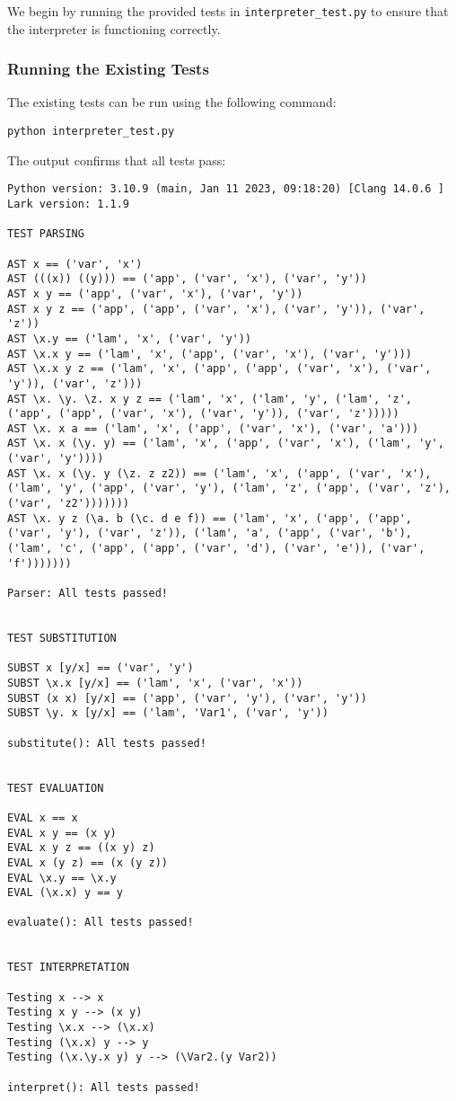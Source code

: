 \documentclass{article}
\theoremstyle{theorem}
\theoremstyle{definition}
\theoremstyle{remark}
\begin{document}
We begin by running the provided tests in \texttt{interpreter\_test.py} to ensure that the interpreter is functioning correctly.

\subsubsection{Running the Existing Tests}

The existing tests can be run using the following command:

\begin{verbatim}
python interpreter_test.py
\end{verbatim}

The output confirms that all tests pass:

\begin{verbatim}
Python version: 3.10.9 (main, Jan 11 2023, 09:18:20) [Clang 14.0.6 ]
Lark version: 1.1.9

TEST PARSING

AST x == ('var', 'x')
AST (((x)) ((y))) == ('app', ('var', 'x'), ('var', 'y'))
AST x y == ('app', ('var', 'x'), ('var', 'y'))
AST x y z == ('app', ('app', ('var', 'x'), ('var', 'y')), ('var', 'z'))
AST \x.y == ('lam', 'x', ('var', 'y'))
AST \x.x y == ('lam', 'x', ('app', ('var', 'x'), ('var', 'y')))
AST \x.x y z == ('lam', 'x', ('app', ('app', ('var', 'x'), ('var', 'y')), ('var', 'z')))
AST \x. \y. \z. x y z == ('lam', 'x', ('lam', 'y', ('lam', 'z', ('app', ('app', ('var', 'x'), ('var', 'y')), ('var', 'z')))))
AST \x. x a == ('lam', 'x', ('app', ('var', 'x'), ('var', 'a')))
AST \x. x (\y. y) == ('lam', 'x', ('app', ('var', 'x'), ('lam', 'y', ('var', 'y'))))
AST \x. x (\y. y (\z. z z2)) == ('lam', 'x', ('app', ('var', 'x'), ('lam', 'y', ('app', ('var', 'y'), ('lam', 'z', ('app', ('var', 'z'), ('var', 'z2')))))))
AST \x. y z (\a. b (\c. d e f)) == ('lam', 'x', ('app', ('app', ('var', 'y'), ('var', 'z')), ('lam', 'a', ('app', ('var', 'b'), ('lam', 'c', ('app', ('app', ('var', 'd'), ('var', 'e')), ('var', 'f')))))))

Parser: All tests passed!


TEST SUBSTITUTION

SUBST x [y/x] == ('var', 'y')
SUBST \x.x [y/x] == ('lam', 'x', ('var', 'x'))
SUBST (x x) [y/x] == ('app', ('var', 'y'), ('var', 'y'))
SUBST \y. x [y/x] == ('lam', 'Var1', ('var', 'y'))

substitute(): All tests passed!


TEST EVALUATION

EVAL x == x
EVAL x y == (x y)
EVAL x y z == ((x y) z)
EVAL x (y z) == (x (y z))
EVAL \x.y == \x.y
EVAL (\x.x) y == y

evaluate(): All tests passed!


TEST INTERPRETATION

Testing x --> x
Testing x y --> (x y)
Testing \x.x --> (\x.x)
Testing (\x.x) y --> y
Testing (\x.\y.x y) y --> (\Var2.(y Var2))

interpret(): All tests passed!
\end{verbatim}
\end{document}
